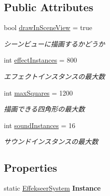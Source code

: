 \subsection*{Public Attributes}
\begin{DoxyCompactItemize}
\item 
bool \hyperlink{class_effekseer_system_a469cf59d9deeaef6e27b15c5fc5ee524}{draw\-In\-Scene\-View} = true
\begin{DoxyCompactList}\small\item\em シーンビューに描画するかどうか \end{DoxyCompactList}\item 
int \hyperlink{class_effekseer_system_a0516609db2194d83016f439b93510f21}{effect\-Instances} = 800
\begin{DoxyCompactList}\small\item\em エフェクトインスタンスの最大数 \end{DoxyCompactList}\item 
int \hyperlink{class_effekseer_system_a2007e297eab6bc504cce40650679b1c4}{max\-Squares} = 1200
\begin{DoxyCompactList}\small\item\em 描画できる四角形の最大数 \end{DoxyCompactList}\item 
int \hyperlink{class_effekseer_system_ac83155c54d94fc6b61f6f53032923667}{sound\-Instances} = 16
\begin{DoxyCompactList}\small\item\em サウンドインスタンスの最大数 \end{DoxyCompactList}\end{DoxyCompactItemize}
\subsection*{Properties}
\begin{DoxyCompactItemize}
\item 
\hypertarget{class_effekseer_system_abaa89ed68be2a0ff10f1ab7b04ce219a}{static \hyperlink{class_effekseer_system}{Effekseer\-System} {\bfseries Instance}}\label{class_effekseer_system_abaa89ed68be2a0ff10f1ab7b04ce219a}

\end{DoxyCompactItemize}


